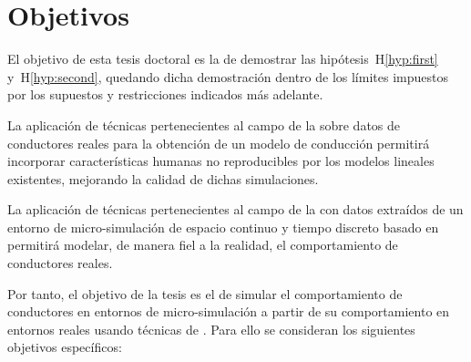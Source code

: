 \section{Objetivos}
\label{ch:intro:objectives}

El objetivo de esta tesis doctoral es la de demostrar las hipótesis~H\ref{hyp:first} y~H\ref{hyp:second}, quedando dicha demostración dentro de los límites impuestos por los supuestos y restricciones indicados más adelante.

\begin{hyp} \label{hyp:first}
	La aplicación de técnicas pertenecientes al campo de la  sobre datos de conductores reales para la obtención de un modelo de conducción permitirá incorporar características humanas no reproducibles por los modelos lineales existentes, mejorando la calidad de dichas simulaciones.
\end{hyp}

\begin{hyp} \label{hyp:second}
	La aplicación de técnicas pertenecientes al campo de la  con datos extraídos de un entorno de micro-simulación de espacio continuo y tiempo discreto basado en  permitirá modelar, de manera fiel a la realidad, el comportamiento de conductores reales.
\end{hyp}

Por tanto, el objetivo de la tesis es el de simular el comportamiento de conductores en entornos de micro-simulación a partir de su comportamiento en entornos reales usando técnicas de . Para ello se consideran los siguientes objetivos específicos:

